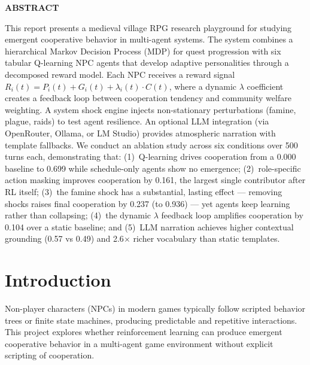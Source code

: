 \documentclass[12pt, a4paper, oneside]{report}
\newcommand{\frontmatterheading}[1]{%
  \begin{center}\Large\bfseries #1\end{center}
  \vspace{0.5cm}
}
\begin{document}
\clearpage
\thispagestyle{plain}
\frontmatterheading{ABSTRACT}

This report presents a medieval village RPG research playground for studying emergent cooperative behavior in multi-agent systems. The system combines a hierarchical Markov Decision Process (MDP) for quest progression with six tabular Q-learning NPC agents that develop adaptive personalities through a decomposed reward model. Each NPC receives a reward signal $R_i(t) = P_i(t) + G_i(t) + \lambda_i(t) \cdot C(t)$, where a dynamic $\lambda$ coefficient creates a feedback loop between cooperation tendency and community welfare weighting. A system shock engine injects non-stationary perturbations (famine, plague, raids) to test agent resilience. An optional LLM integration (via OpenRouter, Ollama, or LM Studio) provides atmospheric narration with template fallbacks. We conduct an ablation study across six conditions over 500 turns each, demonstrating that: (1)~Q-learning drives cooperation from a 0.000 baseline to 0.699 while schedule-only agents show no emergence; (2)~role-specific action masking improves cooperation by 0.161, the largest single contributor after RL itself; (3)~the famine shock has a substantial, lasting effect --- removing shocks raises final cooperation by 0.237 (to 0.936) --- yet agents keep learning rather than collapsing; (4)~the dynamic $\lambda$ feedback loop amplifies cooperation by 0.104 over a static baseline; and (5)~LLM narration achieves higher contextual grounding (0.57 vs 0.49) and 2.6$\times$ richer vocabulary than static templates.

\clearpage
\tableofcontents
\listoffigures
{}
\listoftables
{}

\clearpage
{}
\setcounter{page}{1}

\chapter{Introduction}
\label{chap:introduction}

Non-player characters (NPCs) in modern games typically follow scripted behavior trees or finite state machines, producing predictable and repetitive interactions. This project explores whether reinforcement learning can produce emergent cooperative behavior in a multi-agent game environment without explicit scripting of cooperation.
\end{document}
